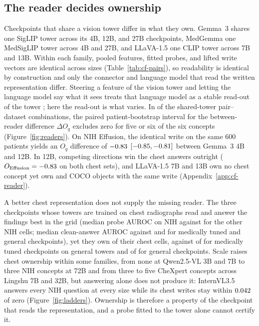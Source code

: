 \documentclass{article}
\begin{document}
\subsection{The reader decides ownership}
\label{sec:reader}

Checkpoints that share a vision tower differ in what they own. Gemma~3 shares one SigLIP tower across its 4B, 12B, and 27B checkpoints, MedGemma one MedSigLIP tower across 4B and 27B, and LLaVA-1.5 one CLIP tower across 7B and 13B. Within each family, pooled features, fitted probes, and lifted write vectors are identical across sizes (Table~\ref{tab:cf-pairs}), so readability is identical by construction and only the connector and language model that read the written representation differ. Steering a feature of the vision tower and letting the language model say what it sees treats that language model as a stable read-out of the tower \citep{ferrando2026explain}; here the read-out is what varies. In \cfPairsFiveOrSix{} of the \cfPairsN{} shared-tower pair--dataset combinations, the paired patient-bootstrap interval for the between-reader difference $\Delta O_q$ excludes zero for five or six of the six concepts (Figure~\ref{fig:readers}). On NIH Effusion, the identical write on the same 600 patients yields an $O_q$ difference of $-0.83$ $[-0.85,-0.81]$ between Gemma~3 4B and 12B. In 12B, competing directions win the chest answers outright ($O_{\mathrm{Effusion}}=-0.83$ on both chest sets), and LLaVA-1.5 7B and 13B own no chest concept yet own \cfLlavaSevenCoco{} and \cfLlavaThirteenCoco{} COCO objects with the same write (Appendix~\ref{app:cf-reader}).

A better chest representation does not supply the missing reader. The three checkpoints whose towers are trained on chest radiographs read and answer the findings best in the grid (median probe AUROC \cfSpecTowerProbeAuroc{} on NIH against \cfSpecRestProbeAuroc{} for the other NIH cells; median clean-answer AUROC \cfSpecTowerAnsAuroc{} against \cfSpecMedAnsAuroc{} and \cfSpecGenAnsAuroc{} for medically tuned and general checkpoints), yet they own \cfSpecTowerOwned{} of their \cfSpecTowerN{} chest cells, against \cfSpecMedOwned{} of \cfSpecMedN{} for medically tuned checkpoints on general towers and \cfSpecGenOwned{} of \cfSpecGenN{} for general checkpoints. Scale raises chest ownership within some families, from none at Qwen2.5-VL 3B and 7B to three NIH concepts at 72B and from three to five CheXpert concepts across Lingshu 7B and 32B, but answering alone does not produce it: InternVL3.5 answers every NIH question at every size while its chest writes stay within $0.042$ of zero (Figure~\ref{fig:ladders}). Ownership is therefore a property of the checkpoint that reads the representation, and a probe fitted to the tower alone cannot certify it.
\end{document}
